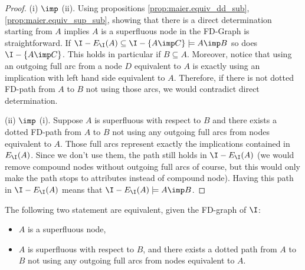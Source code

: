 \begin{proof} (i) $\imp$ (ii). Using propositions \ref{prop:maier.equiv_dd_sub},
\ref{prop:maier.equiv_sup_sub}, showing that there is a direct determination 
starting from $A$ implies $A$ is a superfluous node in the FD-Graph is 
straightforward. If $\I - E_{\I}(A) \subseteq \I - \{A \imp C \} \models A \imp 
B$ so does $\I - \{A \imp C \}$. This holds in particular if $B \subseteq A$. 
Moreover, notice that using an outgoing full arc from a node $D$ equivalent to 
$A$ is exactly using an implication with left hand side equivalent to $A$. 
Therefore, if there is not dotted FD-path from $A$ to $B$ not using those arcs, 
we would contradict direct determination.

\vspace{1.2em}

(ii) $\imp$ (i). Suppose $A$ is superfluous with respect to $B$ and there 
exists a dotted FD-path from $A$ to $B$ not using any outgoing full arcs 
from nodes equivalent to $A$. Those full arcs represent exactly the 
implications contained in $E_{\I}(A)$. Since we don't use them, the path still 
holds in $\I - E_{\I}(A)$ (we would remove compound nodes without outgoing full 
arcs of course, but this would only make the path stops to attributes instead 
of compound node). Having this path in $\I - E_{\I}(A)$ means that $\I - 
E_{\I}(A) \models A \imp B$.
	
\end{proof}

\begin{proposition} \label{prop:maier.equiv_sup_ssup}
	The following two statement are equivalent, given the FD-graph of $\I$:
	\begin{itemize}
		\item[(i)] $A$ is a superfluous node,
		\item[(ii)] $A$ is superfluous with respect to $B$, and there exists a
		dotted path from $A$ to $B$ not using any outgoing full arcs from nodes
		equivalent to $A$.
	\end{itemize}
	
\end{proposition}

